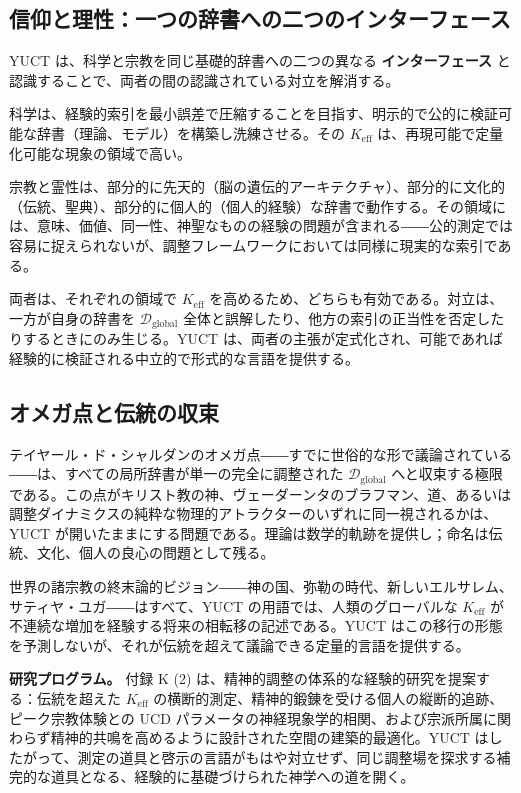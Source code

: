 \documentclass[12pt,a4paper]{article}
\begin{document}
	\subsection{信仰と理性：一つの辞書への二つのインターフェース}
	
	YUCT は、科学と宗教を同じ基礎的辞書への二つの異なる \textbf{インターフェース} と認識することで、両者の間の認識されている対立を解消する。
	
	科学は、経験的索引を最小誤差で圧縮することを目指す、明示的で公的に検証可能な辞書（理論、モデル）を構築し洗練させる。その \(K_{\mathrm{eff}}\) は、再現可能で定量化可能な現象の領域で高い。
	
	宗教と霊性は、部分的に先天的（脳の遺伝的アーキテクチャ）、部分的に文化的（伝統、聖典）、部分的に個人的（個人的経験）な辞書で動作する。その領域には、意味、価値、同一性、神聖なものの経験の問題が含まれる――公的測定では容易に捉えられないが、調整フレームワークにおいては同様に現実的な索引である。
	
	両者は、それぞれの領域で \(K_{\mathrm{eff}}\) を高めるため、どちらも有効である。対立は、一方が自身の辞書を \(\mathcal{D}_{\text{global}}\) 全体と誤解したり、他方の索引の正当性を否定したりするときにのみ生じる。YUCT は、両者の主張が定式化され、可能であれば経験的に検証される中立的で形式的な言語を提供する。
	
	\subsection{オメガ点と伝統の収束}
	
	テイヤール・ド・シャルダンのオメガ点――すでに世俗的な形で議論されている――は、すべての局所辞書が単一の完全に調整された \(\mathcal{D}_{\text{global}}\) へと収束する極限である。この点がキリスト教の神、ヴェーダーンタのブラフマン、道、あるいは調整ダイナミクスの純粋な物理的アトラクターのいずれに同一視されるかは、YUCT が開いたままにする問題である。理論は数学的軌跡を提供し；命名は伝統、文化、個人の良心の問題として残る。
	
	世界の諸宗教の終末論的ビジョン――神の国、弥勒の時代、新しいエルサレム、サティヤ・ユガ――はすべて、YUCT の用語では、人類のグローバルな \(K_{\mathrm{eff}}\) が不連続な増加を経験する将来の相転移の記述である。YUCT はこの移行の形態を予測しないが、それが伝統を超えて議論できる定量的言語を提供する。
	
	\textbf{研究プログラム。} 付録 K (2) は、精神的調整の体系的な経験的研究を提案する：伝統を超えた \(K_{\mathrm{eff}}\) の横断的測定、精神的鍛錬を受ける個人の縦断的追跡、ピーク宗教体験との UCD パラメータの神経現象学的相関、および宗派所属に関わらず精神的共鳴を高めるように設計された空間の建築的最適化。YUCT はしたがって、測定の道具と啓示の言語がもはや対立せず、同じ調整場を探求する補完的な道具となる、経験的に基礎づけられた神学への道を開く。
	
\end{document}
